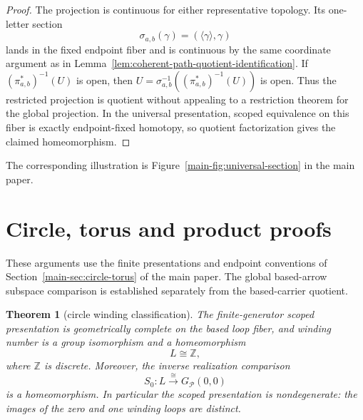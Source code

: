 \documentclass[10pt,reqno]{amsart}
\theoremstyle{definition}
\theoremstyle{plain}
\newtheorem{theorem}[definition]{Theorem}
\theoremstyle{remark}
\newcommand{\Z}{\mathbb Z}
\begin{document}
\begin{proof}
The projection is continuous for either representative topology.  Its
one-letter section
\[
  \sigma_{a,b}(\gamma)=(\langle\gamma\rangle,\gamma)
\]
lands in the fixed endpoint fiber and is continuous by the same coordinate
argument as in Lemma~\ref{lem:coherent-path-quotient-identification}.
If $(\pi_{a,b}^{*})^{-1}(U)$ is open, then
$U=\sigma_{a,b}^{-1}((\pi_{a,b}^{*})^{-1}(U))$ is open.  Thus the restricted
projection is quotient without appealing to a restriction theorem for the
global projection.  In the universal presentation, scoped equivalence on this
fiber is exactly endpoint-fixed homotopy, so quotient factorization gives the
claimed homeomorphism.
\end{proof}

The corresponding illustration is Figure~\ref{main-fig:universal-section} in the main paper.



\section{Circle, torus and product proofs}
These arguments use the finite presentations and endpoint conventions of
Section~\ref{main-sec:circle-torus} of the main paper. The global based-arrow
subspace comparison is established separately from the based-carrier quotient.

\begin{theorem}[circle winding classification]
\label{thm:circle-winding}
The finite-generator scoped presentation is geometrically complete on the
based loop fiber, and winding number is a group isomorphism and a
homeomorphism
\[
  L\cong\Z,
\]
where $\Z$ is discrete.
Moreover, the inverse realization comparison
\[
  S_0:L\xrightarrow{\ \cong\ }G_{\mathcal P}(0,0)
\]
is a homeomorphism.  In particular the scoped presentation is
nondegenerate: the images of the zero and one winding loops are distinct.
\end{theorem}
\end{document}
